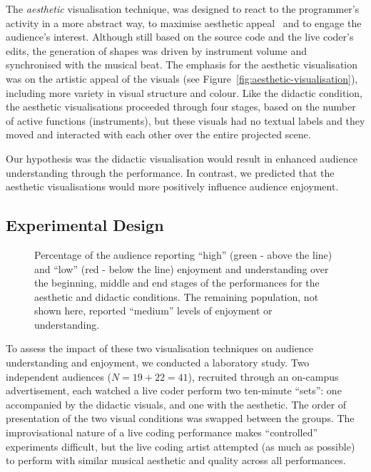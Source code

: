 \documentclass{sig-alternate}
\begin{document}
The \emph{aesthetic} visualisation technique, was designed to react to
the programmer's activity in a more abstract way, to maximise
aesthetic appeal~\cite{Cawthon2007} and to engage the audience's
interest. Although still based on the source code and the live coder's
edits, the generation of shapes was driven by instrument volume and
synchronised with the musical beat. The emphasis for the aesthetic
visualisation was on the artistic appeal of the visuals (see
Figure~\ref{fig:aesthetic-visualisation}), including more variety in
visual structure and colour. Like the didactic condition, the
aesthetic visualisations proceeded through four stages, based on the
number of active functions (instruments), but these visuals had no
textual labels and they moved and interacted with each other over the
entire projected scene.

Our hypothesis was the didactic visualisation would result in enhanced
audience understanding through the performance. In contrast, we
predicted that the aesthetic visualisations would more positively
influence audience enjoyment.

\subsection{Experimental Design}

\begin{figure*}
\centering
{}
\caption{Percentage of the audience reporting ``high'' (green - above
the line) and ``low'' (red - below the line) enjoyment and
understanding over the beginning, middle and end stages of the
performances for the aesthetic and didactic conditions. The remaining
population, not shown here, reported ``medium'' levels of enjoyment or
understanding.}
\label{fig:enjoyment-understanding}
\end{figure*}

To assess the impact of these two visualisation techniques on audience
understanding and enjoyment, we conducted a laboratory study. Two
independent audiences ($N=19+22=41$), recruited through an on-campus
advertisement, each watched a live coder perform two ten-minute
``sets'': one accompanied by the didactic visuals, and one with the
aesthetic. The order of presentation of the two visual conditions was
swapped between the groups. The improvisational nature of a live
coding performance makes ``controlled'' experiments difficult, but the
live coding artist attempted (as much as possible) to perform with
similar musical aesthetic and quality across all performances.
\end{document}
